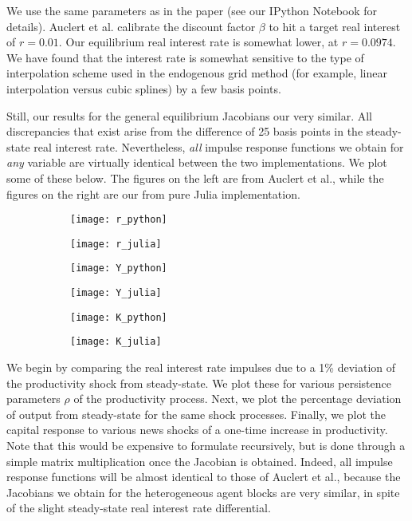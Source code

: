 \documentclass[10pt]{article} %
\begin{document}
We use the same parameters as in the paper (see our IPython Notebook for details). Auclert et al. calibrate the discount factor $\beta$ to hit a target real interest of $r=0.01$. Our equilibrium real interest rate is somewhat lower, at $r=0.0974$. We have found that the interest rate is somewhat sensitive to the type of interpolation scheme used in the endogenous grid method (for example, linear interpolation versus cubic splines) by a few basis points. 

Still, our results for the general equilibrium Jacobians our very similar. All discrepancies that exist arise from the difference of 25 basis points in the steady-state real interest rate. Nevertheless, \emph{all} impulse response functions we obtain for \emph{any} variable are virtually identical between the two implementations. We plot some of these below. The figures on the left are from Auclert et al., while the figures on the right are our from pure Julia implementation.

\begin{figure}[t]
\begin{subfigure}[h]{.5 \textwidth}
\centering
\texttt{[image: r\_python]}
\end{subfigure}
\begin{subfigure}[h]{.5 \textwidth}
\centering
\texttt{[image: r\_julia]}
\end{subfigure}

\begin{subfigure}[h]{.5 \textwidth}
\centering
\texttt{[image: Y\_python]}
\end{subfigure}
\begin{subfigure}[h]{.5 \textwidth}
\centering
\texttt{[image: Y\_julia]}
\end{subfigure}

\begin{subfigure}[h]{.5 \textwidth}
\centering
\texttt{[image: K\_python]}
\end{subfigure}
\begin{subfigure}[h]{.5 \textwidth}
\centering
\texttt{[image: K\_julia]}
\end{subfigure}
\end{figure}


We begin by comparing the real interest rate impulses due to a 1\% deviation of the productivity shock from steady-state. We plot these for various persistence parameters $\rho$ of the productivity process. Next, we plot the percentage deviation of output from steady-state for the same shock processes. Finally, we plot the capital response to various news shocks of a one-time increase in productivity. Note that this would be expensive to formulate recursively, but is done through a simple matrix multiplication once the Jacobian is obtained. Indeed, all impulse response functions will be almost identical to those of Auclert et al., because the Jacobians we obtain for the heterogeneous agent blocks are very similar, in spite of the slight steady-state real interest rate differential.
\end{document}
